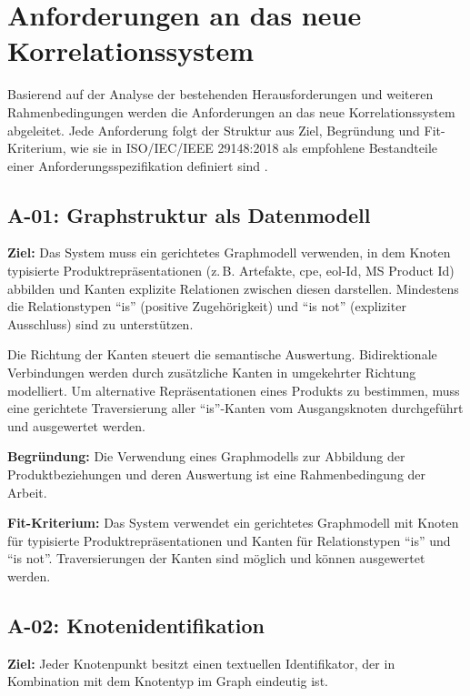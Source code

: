 \section{Anforderungen an das neue Korrelationssystem}\label{sec:requirements}

Basierend auf der Analyse der bestehenden Herausforderungen und weiteren Rahmenbedingungen werden die Anforderungen an das neue Korrelationssystem abgeleitet.
Jede Anforderung folgt der Struktur aus Ziel, Begründung und Fit-Kriterium, wie sie in ISO/IEC/IEEE 29148:2018 als empfohlene Bestandteile einer Anforderungsspezifikation definiert sind \autocite{ISO_29148_2018}.

\subsection{A-01: Graphstruktur als Datenmodell}\label{subsec:req-format-product-graph}

\textbf{Ziel:}
Das System muss ein gerichtetes Graphmodell verwenden, in dem Knoten typisierte Produktrepräsentationen (z.\,B. Artefakte, \acrshort{cpe}, \acrshort{eol}-Id, MS Product Id) abbilden und Kanten explizite Relationen zwischen diesen darstellen.
Mindestens die Relationstypen \enquote{is} (positive Zugehörigkeit) und \enquote{is not} (expliziter Ausschluss) sind zu unterstützen.

Die Richtung der Kanten steuert die semantische Auswertung.
Bidirektionale Verbindungen werden durch zusätzliche Kanten in umgekehrter Richtung modelliert.
Um alternative Repräsentationen eines Produkts zu bestimmen, muss eine gerichtete Traversierung aller \enquote{is}-Kanten vom Ausgangsknoten durchgeführt und ausgewertet werden.

\textbf{Begründung:}
Die Verwendung eines Graphmodells zur Abbildung der Produktbeziehungen und deren Auswertung ist eine Rahmenbedingung der Arbeit.

\textbf{Fit-Kriterium:}
Das System verwendet ein gerichtetes Graphmodell mit Knoten für typisierte Produktrepräsentationen und Kanten für Relationstypen \enquote{is} und \enquote{is not}.
Traversierungen der Kanten sind möglich und können ausgewertet werden.

\subsection{A-02: Knotenidentifikation}\label{subsec:req-node-id-type}

\textbf{Ziel:}
Jeder Knotenpunkt besitzt einen textuellen Identifikator, der in Kombination mit dem Knotentyp im Graph eindeutig ist.

